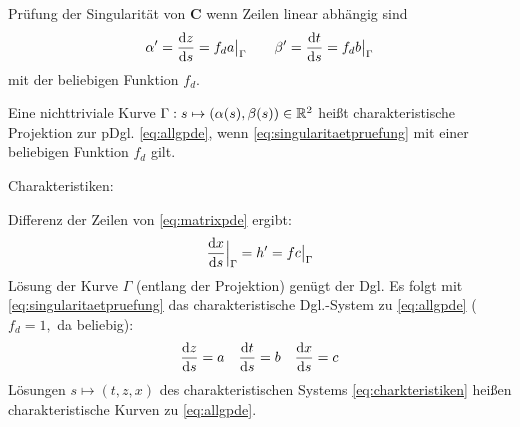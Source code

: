 Prüfung der Singularität von $\bm{C}$ wenn Zeilen linear abhängig sind
\begin{align}
\label{eq:singularitaetpruefung}
\alpha'= \frac{\mathrm{d} z}{\mathrm{d} s} = f_d a \big|_\Gamma \qquad \beta'= \frac{\mathrm{d} t}{\mathrm{d} s} = f_db \big|_\Gamma
\end{align}
mit der beliebigen Funktion $f_d$.
\begin{defi}
Eine nichttriviale Kurve $\Gamma:s\mapsto(\alpha(s),\beta(s)) \in \mathbb{R}^2$ heißt charakteristische Projektion zur pDgl. \eqref{eq:allgpde}, wenn \eqref{eq:singularitaetpruefung} mit einer beliebigen Funktion $f_d$ gilt.
\end{defi}
Charakteristiken:

Differenz der Zeilen von \eqref{eq:matrixpde} ergibt:
\begin{align*}
\frac{\mathrm{d} x}{\mathrm{d} s}\Big\rvert_\Gamma = h'= fc\big|_\Gamma
\end{align*}
Lösung der Kurve $\Gamma$ (entlang der Projektion) genügt der Dgl.
Es folgt mit \eqref{eq:singularitaetpruefung} das charakteristische Dgl.-System zu \eqref{eq:allgpde} ($f_d = 1,$ da beliebig):
\begin{align}
\label{eq:charkteristiken}
\frac{\mathrm{d} z}{\mathrm{d} s} = a \quad \frac{\mathrm{d} t}{\mathrm{d} s} = b \quad \frac{\mathrm{d} x}{\mathrm{d} s} = c
\end{align}
Lösungen $s \mapsto (t,z,x)$ des charakteristischen Systems \eqref{eq:charkteristiken} heißen charakteristische Kurven zu \eqref{eq:allgpde}.